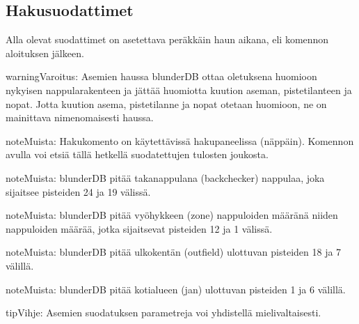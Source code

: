 \documentclass[letterpaper,10pt,finnish]{sphinxmanual}
\begin{document}
\subsection{Hakusuodattimet}
\label{\detokenize{cmd_mode:filtres-de-recherche}}\label{\detokenize{cmd_mode:cmd-filter}}
\sphinxAtStartPar
Alla olevat suodattimet on asetettava peräkkäin haun aikana, eli komennon  aloituksen jälkeen.

\label{\detokenize{cmd_mode:cmd-filter-pos}}
\begin{sphinxadmonition}{warning}{Varoitus:}
\sphinxAtStartPar
Asemien haussa blunderDB ottaa oletuksena huomioon nykyisen nappularakenteen ja jättää huomiotta kuution aseman, pistetilanteen ja nopat. Jotta kuution asema, pistetilanne ja nopat otetaan huomioon, ne on mainittava nimenomaisesti haussa.
\end{sphinxadmonition}

\begin{sphinxadmonition}{note}{Muista:}
\sphinxAtStartPar
Hakukomento  on käytettävissä hakupaneelissa (\sphinxhyphen{}näppäin). Komennon  avulla voi etsiä tällä hetkellä suodatettujen tulosten joukosta.
\end{sphinxadmonition}

\begin{sphinxadmonition}{note}{Muista:}
\sphinxAtStartPar
blunderDB pitää takanappulana (backchecker) nappulaa, joka sijaitsee pisteiden 24 ja 19 välissä.
\end{sphinxadmonition}

\begin{sphinxadmonition}{note}{Muista:}
\sphinxAtStartPar
blunderDB pitää vyöhykkeen (zone) nappuloiden määränä niiden nappuloiden määrää, jotka sijaitsevat pisteiden 12 ja 1 välissä.
\end{sphinxadmonition}

\begin{sphinxadmonition}{note}{Muista:}
\sphinxAtStartPar
blunderDB pitää ulkokentän (outfield) ulottuvan pisteiden 18 ja 7 välillä.
\end{sphinxadmonition}

\begin{sphinxadmonition}{note}{Muista:}
\sphinxAtStartPar
blunderDB pitää kotialueen (jan) ulottuvan pisteiden 1 ja 6 välillä.
\end{sphinxadmonition}

\begin{sphinxadmonition}{tip}{Vihje:}
\sphinxAtStartPar
Asemien suodatuksen parametreja voi yhdistellä mielivaltaisesti.
\end{sphinxadmonition}
\end{document}
